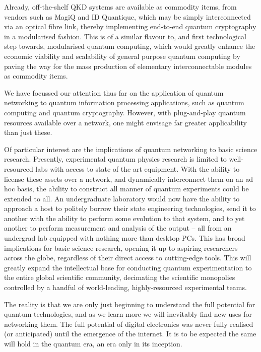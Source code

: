 Already, off-the-shelf QKD systems are available as commodity items, from vendors such as MagiQ and ID Quantique, which may be simply interconnected via an optical fibre link, thereby implementing end-to-end quantum cryptography in a modularised fashion. This is of a similar flavour to, and first technological step towards, modularised quantum computing, which would greatly enhance the economic viability and scalability of general purpose quantum computing by paving the way for the mass production of elementary interconnectable modules as commodity items.

We have focussed our attention thus far on the application of quantum networking to quantum information processing applications, such as quantum computing and quantum cryptography. However, with plug-and-play quantum resources available over a network, one might envisage far greater applicability than just these.

Of particular interest are the implications of quantum networking to basic science research. Presently, experimental quantum physics research is limited to well-resourced labs with access to state of the art equipment. With the ability to license these assets over a network, and dynamically interconnect them on an ad hoc basis, the ability to construct all manner of quantum experiments could be extended to all. An undergraduate laboratory would now have the ability to approach a host to politely borrow their state engineering technologies, send it to another with the ability to perform some evolution to that system, and to yet another to perform measurement and analysis of the output -- all from an undergrad lab equipped with nothing more than desktop PCs. This has broad implications for basic science research, opening it up to aspiring researchers across the globe, regardless of their direct access to cutting-edge tools. This will greatly expand the intellectual base for conducting quantum experimentation to the entire global scientific community, decimating the scientific monopolies controlled by a handful of world-leading, highly-resourced experimental teams.

The reality is that we are only just beginning to understand the full potential for quantum technologies, and as we learn more we will inevitably find new uses for networking them. The full potential of digital electronics was never fully realised (or anticipated) until the emergence of the internet. It is to be expected the same will hold in the quantum era, an era only in its inception.

